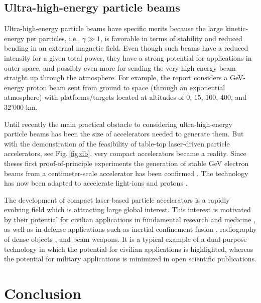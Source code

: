 \documentclass [12pt,a4paper,     ]{report} %
\begin{document}
\section{Ultra-high-energy particle beams}
\label{uhe:0}


Ultra-high-energy particle beams have specific merits because the large kinetic-energy per particles, i.e., $\gamma \gg 1$, is favorable in terms of stability and reduced bending in an external magnetic field.  Even though such beams have a reduced intensity for a given total power, they have a strong potential for applications in outer-space, and possibly even more for sending the very high energy beam straight up through the atmosphere.  For example, the report \cite{BLOOM1983-} considers a GeV-energy proton beam sent from ground to space (through an exponential atmosphere) with platforms/targets located at altitudes of 0, 15, 100, 400, and 32'000 km.


Until recently the main practical obstacle to considering ultra-high-energy particle beams has been the size of accelerators needed to generate them.  But with the demonstration of the feasibility of table-top laser-driven particle accelerators, see Fig.\,\ref{fig:db}, very compact accelerators became a reality.  Since theses first proof-of-principle experiments the generation of stable GeV electron beams from a centimeter-scale accelerator has been confirmed \cite{LEEMA2006-}.  The technology has now been adapted to accelerate light-ions \cite{HEGEL2006-} and protons  \cite{FUCHS2006-,ROBSO2007-}. 

The development of compact laser-based particle accelerators is a rapidly evolving field which is attracting large global interest.  This interest is motivated by their potential for civilian applications in fundamental research \cite{KATSO2004-} and medicine \cite{ROBSO2007-}, as well as in defense applications such as inertial confinement fusion \cite{HEGEL2006-}, radiography of dense objects \cite{FUCHS2006-}, and beam weapons.  It is a typical example of a dual-purpose technology in which the potential for civilian applications is highlighted, whereas the potential for military applications is minimized in open scientific publications.




\chapter{Conclusion}
\label{con:0}
\end{document}
